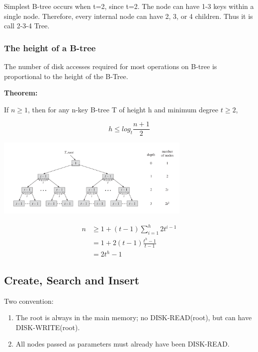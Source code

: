     Simplest B-tree occurs when t=2, since t=2. The node can have 1-3 keys within a 
    single node. Therefore, every internal node can have 2, 3, or 4 children. Thus 
    it is call 2-3-4 Tree.

\subsubsection{The height of a B-tree}\hspace*{5mm}

    The number of disk accesses required for most operations on B-tree
    is proportional to the height of the B-Tree.

    \textbf{Theorem:}

    If $n\geq 1$, then for any n-key B-tree T of height h and minimum degree $t\geq 2$,

    \begin{equation*}
        h \leq log_t \frac{n+1}{2}
    \end{equation*}

    \includegraphics[width=0.7\textwidth]{contents/Advanced_Data_Structure/B_Tree/Images/B_Tree_Height.png}

    \begin{align*}
        n   &\geq 1 + (t-1)\sum_{i=1}^h 2t^{i-1}\\
            &= 1 + 2(t-1)\frac{t^h-1}{t-1}\\
            &=2t^h-1
    \end{align*}

\subsection{Create, Search and Insert}\hspace*{5mm}

    Two convention:
    \begin{enumerate}
        \item The root is always in the main memory; no DISK-READ(root), but can 
        have DISK-WRITE(root).
        \item All nodes passed as parameters must already have been DISK-READ.
    \end{enumerate}

